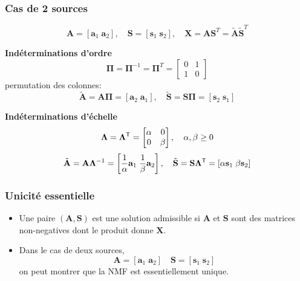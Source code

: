 \documentclass[9pt]{beamer}
\begin{document}
\begin{frame}
\frametitle{Cas de 2 sources}

\begin{equation*}
\mathbf{A} = \left[\mathbf{a}_1 \; \mathbf{a}_2\right], \quad \mathbf{S} = \left[\mathbf{s}_1 \; \mathbf{s}_2\right],\quad  \mathbf{X} = \mathbf{A}\mathbf{S}^T =\tilde{\mathbf{A}}{\tilde{\mathbf{S}}}^T 
\end{equation*}

\alert{\textbf{Indéterminations d'ordre}}
\[
\bm{\Pi} =\bm{\Pi}^{-1} =\bm{\Pi}^{T} = \begin{bmatrix} 0 & 1 \\ 1 & 0
\end{bmatrix}
\]
permutation des colonnes:
\[
\tilde{\mathbf{A}} =\mathbf{A} \bm{\Pi} = \left[\mathbf{a}_2 \; \mathbf{a}_1\right], \quad \tilde{\mathbf{S}} =\mathbf{S} \bm{\Pi} = \left[\mathbf{s}_2 \; \mathbf{s}_1\right]
\]

\alert{\textbf{Indéterminations d'échelle}}
\[
\bm{\Lambda} = \bm{\Lambda}^{{\sf T}} = \begin{bmatrix} \alpha & 0 \\ 0 & \beta
\end{bmatrix},\quad \alpha,\beta \ge 0 
\]
\[
\tilde{\mathbf{A}} = \mathbf{A} \bm{\Lambda}^{-1} = \left[\frac{1}{\alpha}\mathbf{a}_1 \; \frac{1}{\beta}\mathbf{a}_2\right],\quad \tilde{\mathbf{S}} = \mathbf{S} \bm{\Lambda}^{{\sf T}} =  \left[{\alpha}\mathbf{s}_1 \; {\beta}\mathbf{s}_2\right]
\]




\end{frame}


\begin{frame}
\frametitle{Unicité essentielle}


\begin{itemize}[label=\tiny$\blacksquare$]
\item Une paire $(\mathbf{A},\mathbf{S})$ est une solution admissible si
$\mathbf{A}$ et $\mathbf{S}$ sont des matrices non-negatives dont le produit donne  $\mathbf{X}$.
\\[2ex]


\item Dans le cas de deux sources, \ie
\begin{equation*}
     \mathbf{A} = \left[\mathbf{a}_1 \; \mathbf{a}_2\right] \quad \mathbf{S} = \left[\mathbf{s}_1 \; \mathbf{s}_2\right]
\end{equation*}
on peut montrer que la NMF est essentiellement unique.
\end{itemize}
\end{frame}
\end{document}
